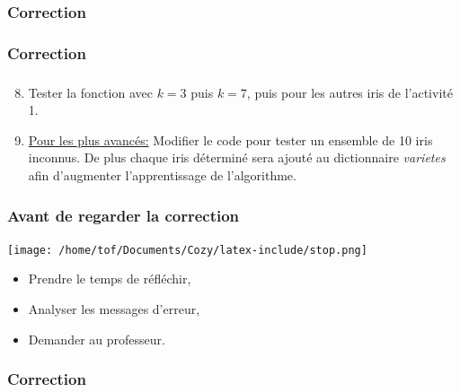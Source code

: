 \documentclass[svgnames,11pt]{beamer}
\begin{document}
\begin{frame}
    \frametitle{Correction}

    

\end{frame}
\begin{frame}
    \frametitle{Correction}

    

\end{frame}
\begin{frame}
    \frametitle{}
    \setcounter{compteuractivite}{2}

    \begin{activite}

        \begin{enumerate}
            \setcounter{enumi}{7}

            \item Tester la fonction avec $k=3$ puis $k=7$, puis pour les autres iris de l'activité 1.
            \item \underline{Pour les plus avancés:} Modifier le code pour tester un ensemble de 10 iris inconnus. De plus chaque iris déterminé sera ajouté au dictionnaire \emph{varietes} afin d'augmenter l'apprentissage de l'algorithme.
        \end{enumerate}
    \end{activite}

\end{frame}
\begin{frame}
    \frametitle{Avant de regarder la correction}
\begin{center}
    \centering
    \texttt{[image: /home/tof/Documents/Cozy/latex-include/stop.png]}
    \end{center}
{\Large
    \begin{itemize}
        \item Prendre le temps de réfléchir,
        \item Analyser les messages d'erreur,
        \item Demander au professeur.
    \end{itemize}
}
\end{frame}
\begin{frame}
    \frametitle{Correction}

    

\end{frame}
\end{document}
